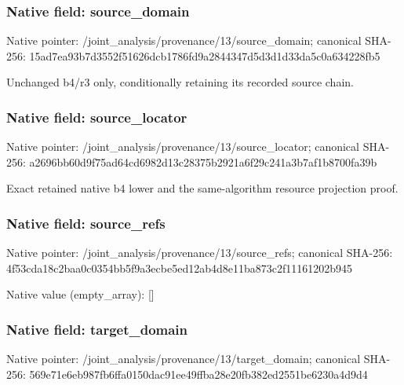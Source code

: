 \documentclass[10pt,a4paper]{article}
\begin{document}
\subsubsection{Native field: source\_\allowbreak{}domain}
Native pointer: /joint\_\allowbreak{}analysis/provenance/13/source\_\allowbreak{}domain; canonical SHA-256: 15ad7ea93b7d3552f51626dcb1786fd9a2844347d5d3d1d33da5c0a634228fb5

\begingroup\raggedright\sloppy Unchanged b4/\allowbreak{}r3 only,\allowbreak{} conditionally retaining its recorded source chain.\par\endgroup

\subsubsection{Native field: source\_\allowbreak{}locator}
Native pointer: /joint\_\allowbreak{}analysis/provenance/13/source\_\allowbreak{}locator; canonical SHA-256: a2696bb60d9f75ad64cd6982d13c28375b2921a6f29c241a3b7af1b8700fa39b

\begingroup\raggedright\sloppy Exact retained native b4 lower and the same-algorithm resource projection proof.\par\endgroup

\subsubsection{Native field: source\_\allowbreak{}refs}
Native pointer: /joint\_\allowbreak{}analysis/provenance/13/source\_\allowbreak{}refs; canonical SHA-256: 4f53cda18c2baa0c0354bb5f9a3ecbe5ed12ab4d8e11ba873c2f11161202b945

Native value (empty\_\allowbreak{}array): []

\subsubsection{Native field: target\_\allowbreak{}domain}
Native pointer: /joint\_\allowbreak{}analysis/provenance/13/target\_\allowbreak{}domain; canonical SHA-256: 569e71e6eb987fb6ffa0150dac91ee49ffba28e20fb382ed2551be6230a4d9d4
\end{document}
